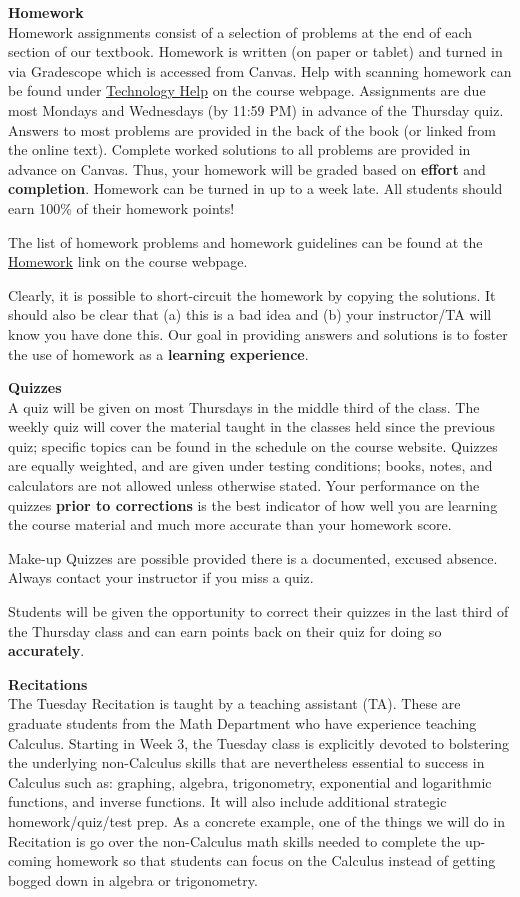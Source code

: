 \documentclass[12pt]{article}
\renewcommand{\emph}[1]{\textsf{\textbf{#1}}}
\newcommand{\localhead}[1]{\par\smallskip\textbf{#1}\nobreak\\}%
\def\heading#1{\localhead{\large\emph{#1}}}
\begin{document}
\heading{Homework}
Homework assignments consist of a selection of problems at the end of each section of our textbook. Homework is written (on paper or tablet) and turned in via Gradescope which is accessed from Canvas.  Help with scanning homework can be found under \href{https://uaf-math251.github.io/techHelp.html}{Technology Help} on the course webpage. Assignments are due most Mondays and Wednesdays (by 11:59 PM) in advance of the Thursday quiz.  Answers to most problems are provided in the back of the book (or linked from the online text). Complete worked solutions to all problems are provided in advance on Canvas. Thus, your homework will be graded based on \emph{effort} and \emph{completion}. Homework can be turned in up to a week late. All students should earn 100\% of their homework points!

The list of homework problems and homework guidelines can be found at the \href{https://uaf-math251.github.io/writtenhomework.html}{Homework} link on the course webpage.

Clearly, it is possible to short-circuit the homework by copying the solutions. It should also be clear that (a) this is a bad idea and (b) your instructor/TA will know you have done this. Our goal in providing answers and solutions is to foster the use of homework as a \emph{learning experience}. 

\heading{Quizzes}
A quiz will be given on most Thursdays in the middle third of the class. The weekly quiz will cover the material taught in the classes held since the previous quiz; specific topics can be found in the schedule on
the course website.  Quizzes are equally weighted, and are given under testing conditions; books, notes, and calculators are not allowed unless otherwise stated. Your performance on the quizzes \emph{prior to corrections} is the best indicator of how well you are learning the course material and much more accurate than your homework score.

Make-up Quizzes are possible provided there is a documented, excused absence. Always contact your instructor if you miss a quiz.

Students will be given the opportunity to correct their quizzes in the last third of the Thursday class and can earn points back on their quiz for doing so \emph{accurately}.

\heading{Recitations}
The Tuesday Recitation is taught by a teaching assistant (TA). These are graduate students from the Math  Department who have experience teaching Calculus. Starting in Week 3, the Tuesday class is explicitly devoted to bolstering the underlying non-Calculus skills that are nevertheless essential to success in Calculus such as: graphing, algebra, trigonometry, exponential and logarithmic functions, and inverse functions. It will also include additional strategic homework/quiz/test prep. As a concrete example, one of the things we will do in Recitation is go over the non-Calculus math skills needed to complete the up-coming homework so that students can focus on the Calculus instead of getting bogged down in algebra or trigonometry.
\end{document}

